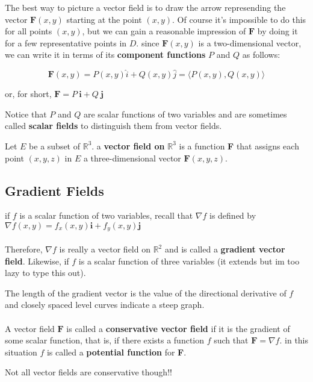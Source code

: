 \documentclass{article}
\begin{document}
The best way to picture a vector field is to draw the arrow represending the vector $\mathbf{F}(x,y)$ starting at the point $(x,y)$. Of course it's impossible to do this for all points $(x,y)$, but we can gain a reasonable impression of $\mathbf{F}$ by doing it for a few representative points in $D$. since $\mathbf{F}(x,y)$ is a two-dimensional vector, we can write it in terms of its \textbf{component functions} $P$ and $Q$ as follows:

$$\mathbf{F}(x,y) = P(x,y)\hat{i} + Q(x,y) \hat{j} = \langle P(x,y), Q(x,y) \rangle$$

or, for short, $\mathbf{F} = P \ \mathbf{i} + Q \  \mathbf{j}$

Notice that $P$ and $Q$ are scalar functions of two variables and are sometimes called \textbf{scalar fields} to distinguish them from vector fields.

\begin{center}
    Let $E$ be a subset of $\mathbb{R}^3$. a \textbf{vector field on} $\mathbb{R}^3$ is a function \textbf{F} that assigns each point $(x,y,z)$ in $E$ a three-dimensional vector $\mathbf{F}(x,y,z)$.
\end{center}

\subsection{Gradient Fields}

if $f$ is a scalar function of two variables, recall that $\nabla f$ is defined by $\nabla f(x,y) = f_x(x,y)\mathbf{i} + f_y(x,y)\mathbf{j} $
\\ 
\\
Therefore, $\nabla f$ is really a vector field on $\mathbb{R}^2$ and is called a \textbf{gradient vector field}. Likewise, if $f$ is a scalar function of three variables (it extends but im too lazy to type this out).

The length of the gradient vector is the value of the directional derivative of $f$ and closely spaced level curves indicate a steep graph.
\\ 
\\
A vector field $\mathbf{F}$ is called a \textbf{conservative vector field} if it is the gradient of some scalar function, that is, if there exists a function $f$ such that $\mathbf{F} = \nabla f$. in this situation $f$ is called a \textbf{potential function} for \textbf{F}.

Not all vector fields are conservative though!!
\end{document}
